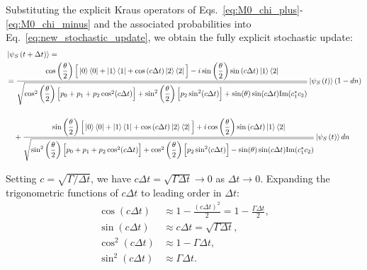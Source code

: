 \documentclass[a4paper,12pt]{article}
\begin{document}
Substituting the explicit Kraus operators of Eqs.~\eqref{eq:M0_chi_plus}-\eqref{eq:M0_chi_minus} 
and the associated probabilities into Eq.~\eqref{eq:new_stochastic_update}, we obtain the 
fully explicit stochastic update:
{\footnotesize
\begin{align}
	&\ket{\psi_{S}\left(t + \Delta t \right)} = \notag \\
	&= \frac{\cos\left(\dfrac{\theta}{2}\right) \Big[ \ket{0}\bra{0} + \ket{1}\bra{1} + \cos\left(c\Delta t\right)\ket{2}\bra{2} \Big] 
	- i\sin\left(\dfrac{\theta}{2}\right)\sin\left(c\Delta t\right)\ket{1}\bra{2}} {\sqrt{\cos^{2}\left(\dfrac{\theta}{2}\right)\Big[p_{0}+p_{1}+p_{2}\cos^{2}(c\Delta t)\Big] + \sin^{2}\left(\dfrac{\theta}{2}\right)\Big[p_{2}\sin^{2}(c\Delta t)\Big] + \sin(\theta)\sin(c\Delta t) \text{Im}(c_{1}^{*}c_{2})}} \ket{\psi_{S}\left(t\right)} \left(1-dn\right) \notag \\[14pt]
	&\quad + \frac{\sin\left(\dfrac{\theta}{2}\right) \Big[ \ket{0}\bra{0} + \ket{1}\bra{1} + \cos\left(c\Delta t\right)\ket{2}\bra{2} \Big] + i\cos\left(\dfrac{\theta}{2}\right)\sin\left(c\Delta t\right)\ket{1}\bra{2}} {\sqrt{\sin^{2}\left(\dfrac{\theta}{2}\right)\Big[p_{0}+p_{1}+p_{2}\cos^{2}(c\Delta t)\Big] + \cos^{2}\left(\dfrac{\theta}{2}\right)\Big[p_{2}\sin^{2}(c\Delta t)\Big] - \sin(\theta)\sin(c\Delta t) \text{Im}(c_{1}^{*}c_{2})}} \ket{\psi_{S}\left(t\right)} dn \label{eq:full_substitution_photoemission}
\end{align}
}

Setting $c = \sqrt{\Gamma/\Delta t}$, we have $c\Delta t = \sqrt{\Gamma\Delta t} \to 0$ 
as $\Delta t \to 0$. Expanding the trigonometric functions of $c\Delta t$ to leading 
order in $\Delta t$:
\begin{align}
	\cos(c\Delta t) &\approx 1 - \frac{(c\Delta t)^{2}}{2} = 1 - \frac{\Gamma\Delta t}{2}, 
	\label{eq:cos_cdt_expansion} \\
	\sin(c\Delta t) &\approx c\Delta t = \sqrt{\Gamma\Delta t}, 
	\label{eq:sin_cdt_expansion} \\
	\cos^{2}(c\Delta t) &\approx 1 - \Gamma\Delta t, 
	\label{eq:cos2_cdt_expansion} \\
	\sin^{2}(c\Delta t) &\approx \Gamma\Delta t. 
	\label{eq:sin2_cdt_expansion}
\end{align}
\end{document}
